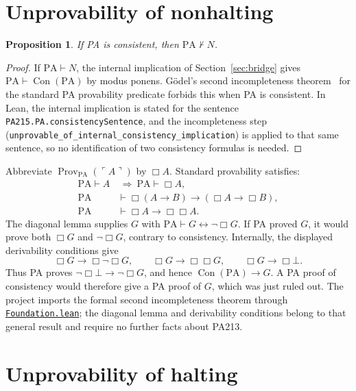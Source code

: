 \documentclass[11pt,letterpaper]{article}
\newtheorem{proposition}[theorem]{Proposition}
\newcommand{\PA}{\mathrm{PA}}
\newcommand{\Con}{\operatorname{Con}}
\newcommand{\Prov}{\operatorname{Prov}}
\newcommand{\code}[1]{\ulcorner #1\urcorner}
\newcommand{\src}[2]{\href{https://github.com/jamesyc/BusyBeaver/blob/034d08df73b94e9f4036fc5af74b694eb73afc67/#1}{\texttt{\nolinkurl{#2}}}}
\newcommand{\repo}[1]{\texttt{\nolinkurl{#1}}}
\begin{document}
\section{Unprovability of nonhalting}\label{sec:first-side}

\begin{proposition}\label{prop:first}
If PA is consistent, then $\PA\nvdash N$.
\end{proposition}
\begin{proof}
If $\PA\vdash N$, the internal implication of
Section~\ref{sec:bridge} gives $\PA\vdash\Con(\PA)$ by modus ponens.
G\"odel's second incompleteness theorem~\cite{goedel} for the standard PA
provability predicate forbids this when PA is consistent. In Lean, the
internal implication is stated for the sentence
\repo{PA215.PA.consistencySentence}, and the incompleteness step
(\repo{unprovable_of_internal_consistency_implication}) is applied to
that same sentence, so no identification of two consistency formulas is
needed.
\end{proof}

Abbreviate
$\Prov_{\PA}(\code A)$ by $\Box A$. Standard provability satisfies:
\begin{align*}
\PA\vdash A&\ \Longrightarrow\ \PA\vdash\Box A,\\
\PA&\vdash\Box(A\to B)\to(\Box A\to\Box B),\\
\PA&\vdash\Box A\to\Box\Box A.
\end{align*}
The diagonal lemma supplies $G$ with
$\PA\vdash G\leftrightarrow\neg\Box G$. If PA proved $G$, it would
prove both $\Box G$ and $\neg\Box G$, contrary to consistency.
Internally, the displayed derivability conditions give
\[
\Box G\to\Box\neg\Box G,\qquad
\Box G\to\Box\Box G,\qquad
\Box G\to\Box\bot.
\]
Thus PA proves $\neg\Box\bot\to\neg\Box G$, and hence
$\Con(\PA)\to G$. A PA proof of consistency would therefore give a
PA proof of $G$, which was just ruled out. The project imports the
formal second incompleteness theorem through
\src{Lean/metamathematics/PA215PA/Foundation.lean}{Foundation.lean};
the diagonal lemma and derivability conditions belong to that general
result and require no further facts about PA213.

\section{Unprovability of halting}\label{sec:two-sided}
\end{document}
